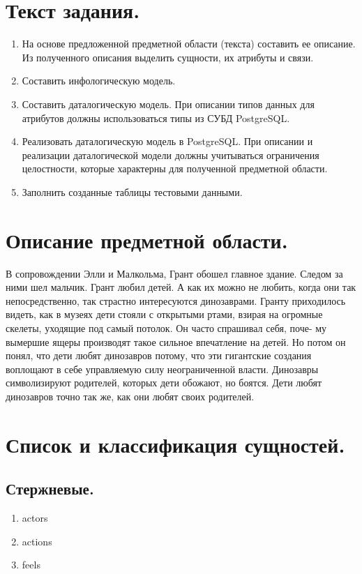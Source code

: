 
\vspace{3cm}
\tableofcontents

\newpage

\section{Текст задания.}
\begin{enumerate}
    \item На основе предложенной предметной области (текста) составить ее описание. Из полученного описания выделить сущности, их атрибуты и связи.
    \item Составить инфологическую модель.
    \item Составить даталогическую модель. При описании типов данных для атрибутов должны использоваться типы из СУБД PostgreSQL.
    \item Реализовать даталогическую модель в PostgreSQL. При описании и реализации даталогической модели должны учитываться ограничения целостности, которые характерны для полученной предметной области.
    \item Заполнить созданные таблицы тестовыми данными.
\end{enumerate}

\section{Описание предметной области.}
В сопровождении Элли и Малкольма, Грант обошел главное здание. Следом за ними шел мальчик. Грант любил детей. А как их
можно не любить, когда они так непосредственно, так страстно интересуются динозаврами. Гранту приходилось видеть, как в
музеях дети стояли с открытыми ртами, взирая на огромные скелеты, уходящие под самый потолок. Он часто спрашивал себя,
поче- му вымершие ящеры производят такое сильное впечатление на детей. Но потом он понял, что дети любят динозавров
потому, что эти гигантские создания воплощают в себе управляемую силу неограниченной власти. Динозавры символизируют
родителей, которых дети обожают, но боятся. Дети любят динозавров точно так же, как они любят своих родителей.

\section{Список и классификация сущностей.}

\subsection{Стержневые.}
\begin{enumerate}
    \item actors
    \item actions
    \item feels
\end{enumerate}

